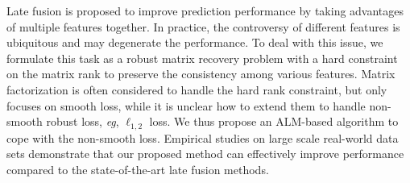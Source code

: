 \documentclass[10pt,twocolumn,letterpaper]{article}
\def\eg{{\emph{e.g.}}}
\def\eg{\emph{eg}}
\begin{document}
Late fusion is proposed to improve prediction performance by taking advantages of multiple features together.
In practice, the controversy of different features is ubiquitous and may degenerate the performance.
To deal with this issue, we formulate this task as a robust matrix recovery problem with a hard constraint on the matrix rank to preserve the consistency among various features.
Matrix factorization is often considered to handle the hard rank constraint, but only focuses on smooth loss, while it is unclear how to extend them to handle non-smooth robust loss, \eg, $\ell_{1,2}$ loss.
We thus propose an ALM-based algorithm to cope with the non-smooth loss.
Empirical studies on large scale real-world data sets demonstrate that our proposed method can effectively improve performance compared to the state-of-the-art late fusion methods.

{\small


}
\end{document}
